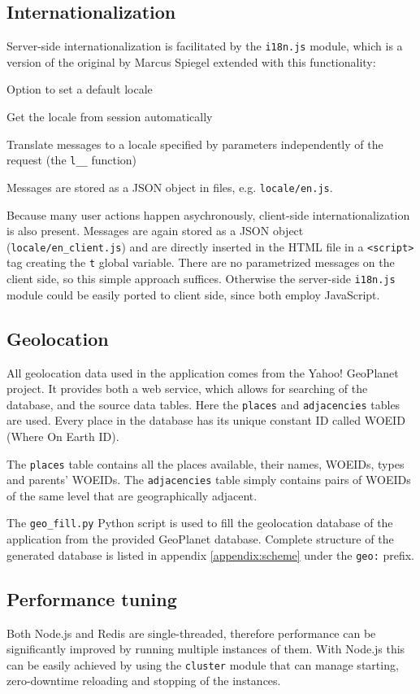 \documentclass[12pt,oneside]{fithesis}
\begin{document}
	\subsection{Internationalization}
		Server-side internationalization is facilitated by the \texttt{i18n.js} module, which is a version of the original by Marcus Spiegel extended with this functionality:
		\begin{compactitem}
			\item Option to set a default locale
			\item Get the locale from session automatically
			\item Translate messages to a locale specified by parameters independently of the request (the \texttt{l\_\_} function)
		\end{compactitem}
		Messages are stored as a JSON object in files, e.g. \texttt{locale/en.js}.
		
		Because many user actions happen asychronously, client-side internationalization is also present. Messages are again stored as a JSON object (\texttt{locale/en\_client.js}) and are directly inserted in the HTML file in a \texttt{<script>} tag creating the \texttt{t} global variable. There are no parametrized messages on the client side, so this simple approach suffices. Otherwise the server-side \texttt{i18n.js} module could be easily ported to client side, since both employ JavaScript.
	\subsection{Geolocation}
	\label{section:geo}
		All geolocation data used in the application comes from the Yahoo! GeoPlanet project. \cite{website:geoplanet} It provides both a web service, which allows for searching of the database, and the source data tables. Here the \texttt{places} and \texttt{adjacencies} tables are used. Every place in the database has its unique constant ID called WOEID (Where On Earth ID). 
		
		The \texttt{places} table contains all the places available, their names, WOEIDs, types and parents' WOEIDs. The \texttt{adjacencies} table simply contains pairs of WOEIDs of the same level that are geographically adjacent.
		
		The \texttt{geo\_fill.py} Python script is used to fill the geolocation database of the application from the provided GeoPlanet database. Complete structure of the generated database is listed in appendix \ref{appendix:scheme} under the \texttt{geo:} prefix.
	\subsection{Performance tuning}
		Both Node.js and Redis are single-threaded, therefore performance can be significantly improved by running multiple instances of them. With Node.js this can be easily achieved by using the \texttt{cluster} module that can manage starting, zero-downtime reloading and stopping of the instances. 
		
\end{document}
